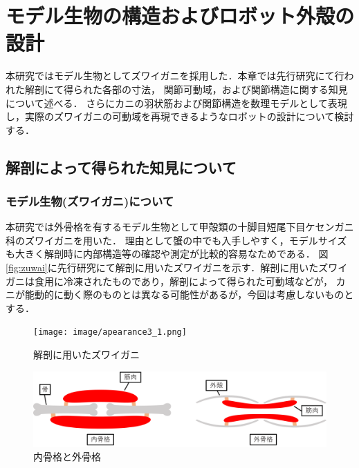 \newpage
\section{モデル生物の構造およびロボット外殻の設計}
本研究ではモデル生物としてズワイガニを採用した．本章では先行研究\cite{hasegawa}にて行われた解剖にて得られた各部の寸法，
関節可動域，および関節構造に関する知見について述べる．
さらにカニの羽状筋および関節構造を数理モデルとして表現し，実際のズワイガニの可動域を再現できるようなロボットの設計について検討する．
\subsection{解剖によって得られた知見について}
\subsubsection{モデル生物(ズワイガニ)について}
本研究では外骨格を有するモデル生物として甲殻類の十脚目短尾下目ケセンガニ科のズワイガニを用いた．
理由として蟹の中でも入手しやすく，モデルサイズも大きく解剖時に内部構造等の確認や測定が比較的容易なためである．
図\ref{fig:zuwai}に先行研究にて解剖に用いたズワイガニを示す．解剖に用いたズワイガニは食用に冷凍されたものであり，解剖によって得られた可動域などが，
カニが能動的に動く際のものとは異なる可能性があるが，今回は考慮しないものとする．
\begin{figure}[htbp]
  \begin{minipage}{0.49\hsize}
    \centering
    \texttt{[image: image/apearance3\_1.png]}
    \caption{解剖に用いたズワイガニ\cite{hasegawa}}
    \label{fig:zuwai}
  \end{minipage}
  \begin{minipage}{0.49\hsize}
    \vspace{10mm}
    \centering
    \includegraphics[scale=0.058]{image/kokkaku.png}
    \vspace{5mm}
    \caption{内骨格と外骨格\cite{hasegawa}}
    \label{fig:naigai}
  \end{minipage}
\end{figure}
